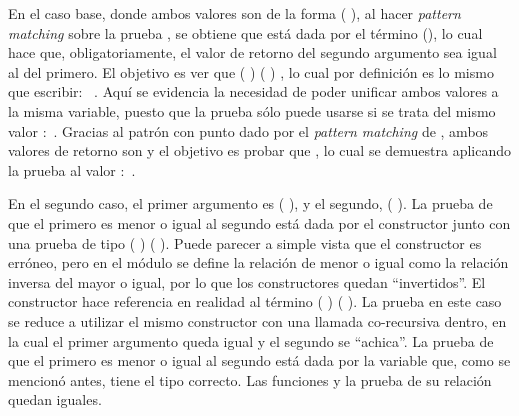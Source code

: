 \begin{AgdaAlign}
En el caso base, donde ambos valores son de la forma ( ), al hacer \textit{pattern matching} sobre la prueba , se obtiene que está dada por el término (), lo cual hace que, obligatoriamente, el valor de retorno del segundo argumento sea igual al del primero. El objetivo es ver que  ( )    ( ) , lo cual por definición es lo mismo que escribir: \hbox{  }. Aquí se evidencia la necesidad de poder unificar ambos valores a la misma variable, puesto que la prueba  sólo puede usarse si se trata del mismo valor  $:$ . Gracias al patrón con punto dado por el \textit{pattern matching} de , ambos valores de retorno son  y el objetivo es probar que   , lo cual se demuestra aplicando la prueba  al valor  $:$ . 

En el segundo caso, el primer argumento es ( ), y el segundo, ( ). La prueba de que el primero es menor o igual al segundo está dada por el constructor  junto con una prueba  de tipo ( )  (\AgdaField{$\flat$} ). Puede parecer a simple vista que el constructor es erróneo, pero en el módulo  se define la relación de menor o igual como la relación inversa del mayor o igual, por lo que los constructores quedan ``invertidos''. El constructor  hace referencia en realidad al término ( )  ( ). La prueba en este caso se reduce a utilizar el mismo constructor con una llamada co-recursiva dentro, en la cual el primer argumento queda igual y el segundo se ``achica''. La prueba de que el primero es menor o igual al segundo está dada por la variable  que, como se mencionó antes, tiene el tipo correcto. Las funciones y la prueba de su relación quedan iguales.


\end{AgdaAlign}
